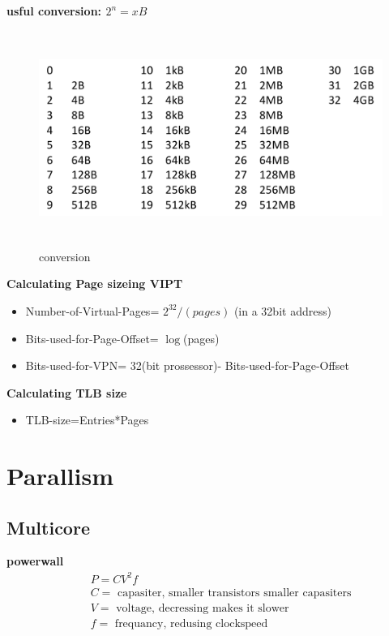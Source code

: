 \documentclass{article}
\begin{document}
\newpage

\textbf{usful conversion: $2^n=xB$}
\begin{figure}[h]
    \vspace{10mm}
    \centering
    \includegraphics[width=16cm, height=7cm]{image/conversion.png}
    \caption{conversion}
\end{figure}


\textbf{Calculating Page sizeing VIPT}
\begin{itemize}
\item  Number-of-Virtual-Pages= $2^{32}/(pages)$  (in a 32bit address)
\item  Bits-used-for-Page-Offset= $\log$(pages)
\item  Bits-used-for-VPN= 32(bit prossessor)- Bits-used-for-Page-Offset
\end{itemize}

\textbf{Calculating TLB size}
\begin{itemize}
\item  TLB-size=Entries*Pages
\end{itemize}


\newpage


\section{Parallism}

\subsection{Multicore}
\textbf{powerwall}
\begin{align*}
  &\quad P=CV^2f \\
  &\quad C= \text{ capasiter, smaller transistors smaller capasiters} \\
  &\quad V= \text{ voltage, decressing makes it slower} \\
  &\quad f= \text{ frequancy, redusing clockspeed} \\
\end{align*}
\end{document}
